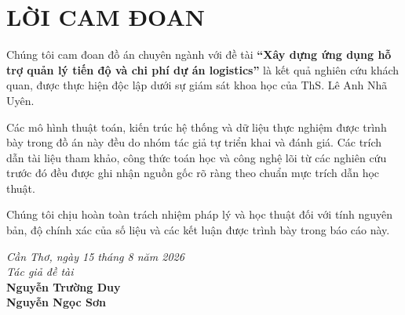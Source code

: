 \chapter*{LỜI CAM ĐOAN}

Chúng tôi cam đoan đồ án chuyên ngành với đề tài \textbf{“Xây dựng ứng dụng hỗ trợ quản lý tiến độ và chi phí dự án logistics”} là kết quả nghiên cứu khách quan, được thực hiện độc lập dưới sự giám sát khoa học của ThS. Lê Anh Nhã Uyên.

Các mô hình thuật toán, kiến trúc hệ thống và dữ liệu thực nghiệm được trình bày trong đồ án này đều do nhóm tác giả tự triển khai và đánh giá. Các trích dẫn tài liệu tham khảo, công thức toán học và công nghệ lõi từ các nghiên cứu trước đó đều được ghi nhận nguồn gốc rõ ràng theo chuẩn mực trích dẫn học thuật.

Chúng tôi chịu hoàn toàn trách nhiệm pháp lý và học thuật đối với tính nguyên bản, độ chính xác của số liệu và các kết luận được trình bày trong báo cáo này.
\vspace{0.5cm}
\begin{flushright}
    \begin{minipage}{0.5\textwidth}
        \centering
        \textit{Cần Thơ, ngày 15 tháng 8 năm 2026} \\[10pt]
        \textit{Tác giả đề tài} \\[0.5cm]
        \textbf{Nguyễn Trường Duy} \\[10pt]
        \textbf{Nguyễn Ngọc Sơn}
    \end{minipage}
\end{flushright}

